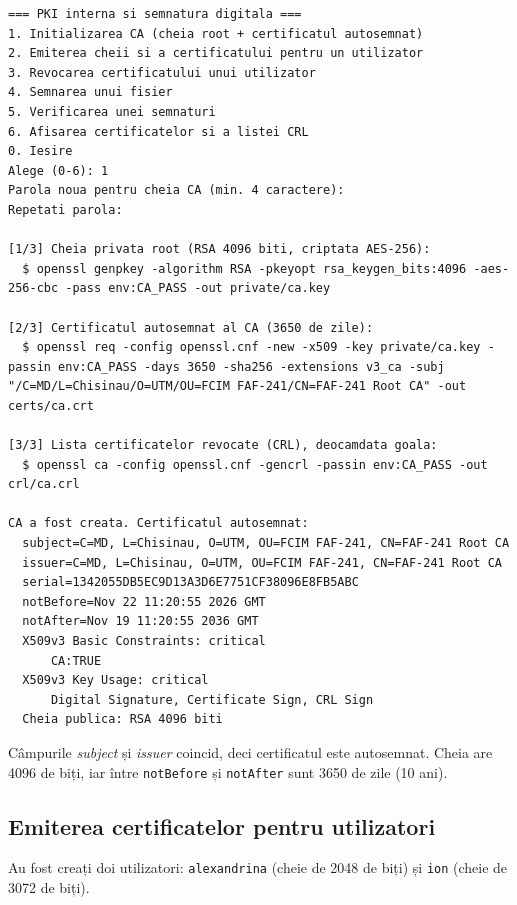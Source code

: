 \documentclass[12pt,a4paper]{article}
\begin{document}
\begin{lstlisting}[style=terminal, caption={Crearea CA și a certificatului autosemnat}]
=== PKI interna si semnatura digitala ===
1. Initializarea CA (cheia root + certificatul autosemnat)
2. Emiterea cheii si a certificatului pentru un utilizator
3. Revocarea certificatului unui utilizator
4. Semnarea unui fisier
5. Verificarea unei semnaturi
6. Afisarea certificatelor si a listei CRL
0. Iesire
Alege (0-6): 1
Parola noua pentru cheia CA (min. 4 caractere):
Repetati parola:

[1/3] Cheia privata root (RSA 4096 biti, criptata AES-256):
  $ openssl genpkey -algorithm RSA -pkeyopt rsa_keygen_bits:4096 -aes-256-cbc -pass env:CA_PASS -out private/ca.key

[2/3] Certificatul autosemnat al CA (3650 de zile):
  $ openssl req -config openssl.cnf -new -x509 -key private/ca.key -passin env:CA_PASS -days 3650 -sha256 -extensions v3_ca -subj "/C=MD/L=Chisinau/O=UTM/OU=FCIM FAF-241/CN=FAF-241 Root CA" -out certs/ca.crt

[3/3] Lista certificatelor revocate (CRL), deocamdata goala:
  $ openssl ca -config openssl.cnf -gencrl -passin env:CA_PASS -out crl/ca.crl

CA a fost creata. Certificatul autosemnat:
  subject=C=MD, L=Chisinau, O=UTM, OU=FCIM FAF-241, CN=FAF-241 Root CA
  issuer=C=MD, L=Chisinau, O=UTM, OU=FCIM FAF-241, CN=FAF-241 Root CA
  serial=1342055DB5EC9D13A3D6E7751CF38096E8FB5ABC
  notBefore=Nov 22 11:20:55 2026 GMT
  notAfter=Nov 19 11:20:55 2036 GMT
  X509v3 Basic Constraints: critical
      CA:TRUE
  X509v3 Key Usage: critical
      Digital Signature, Certificate Sign, CRL Sign
  Cheia publica: RSA 4096 biti
\end{lstlisting}

Câmpurile \textit{subject} și \textit{issuer} coincid, deci certificatul este
autosemnat. Cheia are 4096 de biți, iar între \texttt{notBefore} și
\texttt{notAfter} sunt 3650 de zile (10 ani).

\subsection{Emiterea certificatelor pentru utilizatori}

Au fost creați doi utilizatori: \texttt{alexandrina} (cheie de 2048 de biți) și
\texttt{ion} (cheie de 3072 de biți).
\end{document}
